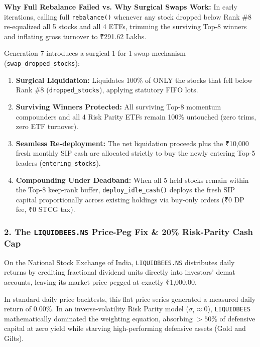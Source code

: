 \documentclass[11pt,a4paper]{article}
\begin{document}
\textbf{Why Full Rebalance Failed vs. Why Surgical Swaps Work:} In early iterations, calling full \texttt{rebalance()} whenever any stock dropped below Rank \#8 re-equalized all 5 stocks and all 4 ETFs, trimming the surviving Top-8 winners and inflating gross turnover to ₹291.62 Lakhs.

Generation 7 introduces a surgical 1-for-1 swap mechanism (\texttt{swap\_dropped\_stocks}):
\begin{enumerate}[leftmargin=*]
    \item \textbf{Surgical Liquidation:} Liquidates 100\% of ONLY the stocks that fell below Rank \#8 (\texttt{dropped\_stocks}), applying statutory FIFO lots.
    \item \textbf{Surviving Winners Protected:} All surviving Top-8 momentum compounders and all 4 Risk Parity ETFs remain 100\% untouched (zero trims, zero ETF turnover).
    \item \textbf{Seamless Re-deployment:} The net liquidation proceeds plus the ₹10,000 fresh monthly SIP cash are allocated strictly to buy the newly entering Top-5 leaders (\texttt{entering\_stocks}).
    \item \textbf{Compounding Under Deadband:} When all 5 held stocks remain within the Top-8 keep-rank buffer, \texttt{deploy\_idle\_cash()} deploys the fresh SIP capital proportionally across existing holdings via buy-only orders (₹0 DP fee, ₹0 STCG tax).
\end{enumerate}

\subsubsection{2. The \texttt{LIQUIDBEES.NS} Price-Peg Fix \& 20\% Risk-Parity Cash Cap}
On the National Stock Exchange of India, \texttt{LIQUIDBEES.NS} distributes daily returns by crediting fractional dividend units directly into investors' demat accounts, leaving its market price pegged at exactly ₹1,000.00. 

In standard daily price backtests, this flat price series generated a measured daily return of $0.00\%$. In an inverse-volatility Risk Parity model ($\sigma_i \approx 0$), \texttt{LIQUIDBEES} mathematically dominated the weighting equation, absorbing $>50\%$ of defensive capital at zero yield while starving high-performing defensive assets (Gold and Gilts).
\end{document}
